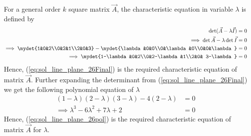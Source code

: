 For a general order $k$ square matrix $\vec{A}$, the characteristic equation in variable $\lambda$ is defined by
\begin{align}
\det({\vec{A}-\lambda \vec{I}}) &= 0\label{eq:eq:sol_line_plane_26Char1}\\
\implies\det{\vec{A}}-\lambda \det{\vec{I}} &= 0\\
\implies\mydet{1&0&2\\0&2&1\\2&0&3}-\mydet{\lambda &0&0\\0&\lambda &0\\0&0&\lambda } &= 0\\
\implies\mydet{1-\lambda &0&2\\0&2-\lambda &1\\2&0& 3-\lambda} &= 0\label{eq:eq:sol_line_plane_26Final}
\end{align}
Hence, (\ref{eq:sol_line_plane_26Final}) is the required characteristic equation of matrix $\vec{A}$. Further expanding the determinant from (\ref{eq:sol_line_plane_26Final}) we get the following polynomial equation of $\lambda$ 
\begin{align}
(1-\lambda )(2-\lambda)(3-\lambda)-4(2-\lambda) &= 0\\
\implies\lambda^3-6\lambda^2+7\lambda+2 &=0\label{eq:eq:sol_line_plane_26pol}
\end{align}
Hence, (\ref{eq:sol_line_plane_26pol}) is the required characteristic equation of matrix $\vec{A}$ for $\lambda$.
